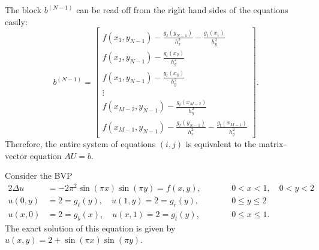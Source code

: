 \documentclass{homework}
\begin{document}
\begin{alphaparts}
\begin{equation*}
		\end{equation*}
		The block $b^{(N-1)}$ can be read off from the right hand sides of the equations easily:
		\begin{equation*}
			b^{(N-1)} = \left[\begin{matrix}
				f(x_1,y_{N-1}) - \frac{g_\ell(y_{N-1})}{h_x^2} - \frac{g_t(x_1)}{h_y^2} \\
				f(x_2,y_{N-1}) - \frac{g_t(x_2)}{h_y^2} \\
				f(x_3,y_{N-1}) - \frac{g_t(x_3)}{h_y^2} \\
				\vdots \\
				f(x_{M-2},y_{N-1}) - \frac{g_t(x_{M-2})}{h_y^2}\\
				f(x_{M-1},y_{N-1}) - \frac{g_r(y_{N-1})}{h_x^2} - \frac{g_t(x_{M-1})}{h_y^2}
			\end{matrix}\right].
		\end{equation*}
		Therefore, the entire system of equations $(i,j)$ is equivalent to the matrix-vector equation $AU = b$.
	\end{alphaparts}
	
	\question
	Consider the BVP
	\begin{alignat*}{2}
		\Delta u &= -2\pi^2\sin(\pi x)\sin(\pi y) = f(x,y), &\qquad &0<x<1, \quad 0<y<2 \\
		u(0,y) &= 2 = g_\ell(y), \quad u(1, y) = 2 = g_r(y), & \qquad &0 \le y \le 2\\
		u(x,0) &= 2 = g_b(x), \quad u(x, 1) = 2 = g_t(y), & \qquad &0 \le x \le 1. 
	\end{alignat*}
	The exact solution of this equation is given by $u(x,y) = 2 +\sin(\pi x)\sin(\pi y)$.
	
\end{document}
